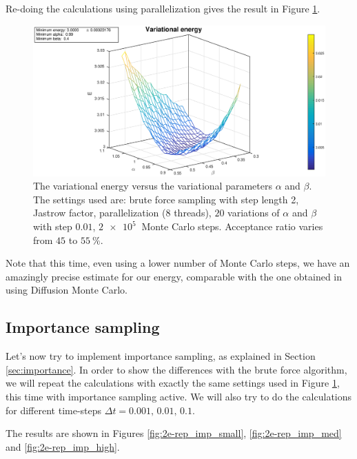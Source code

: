 \documentclass[a4paper,twoside,11pt]{book}
\begin{document}
Re-doing the calculations using parallelization gives the result in Figure \ref{fig:2e_rep_parallel}.
\begin{figure}[H]
	\centering
	\includegraphics[width=\textwidth]{2e-rep_parallel}
	\caption{The variational energy versus the variational parameters $\alpha$ and $\beta$. The settings used are: brute force sampling with step length 2, Jastrow factor, parallelization (8 threads), $20$ variations of $\alpha$ and $\beta$ with step $0.01$, $\SI{2e5}{}$ Monte Carlo steps. Acceptance ratio varies from $45$ to $\SI{55}{\percent}$.}
	\label{fig:2e_rep_parallel}
\end{figure}
Note that this time, even using a lower number of Monte Carlo steps, we have an amazingly precise estimate for our energy, comparable with the one obtained in \cite{PedersenLohne2011} using Diffusion Monte Carlo.

\subsection{Importance sampling}
Let's now try to implement importance sampling, as explained in Section \ref{sec:importance}. In order to show the differences with the brute force algorithm, we will repeat the calculations with exactly the same settings used in Figure \ref{fig:2e_rep_parallel}, this time with importance sampling active. We will also try to do the calculations for different time-steps $\Delta t = 0.001,\,0.01,\,0.1$.

The results are shown in Figures \ref{fig:2e-rep_imp_small}, \ref{fig:2e-rep_imp_med} and \ref{fig:2e-rep_imp_high}.
\end{document}
